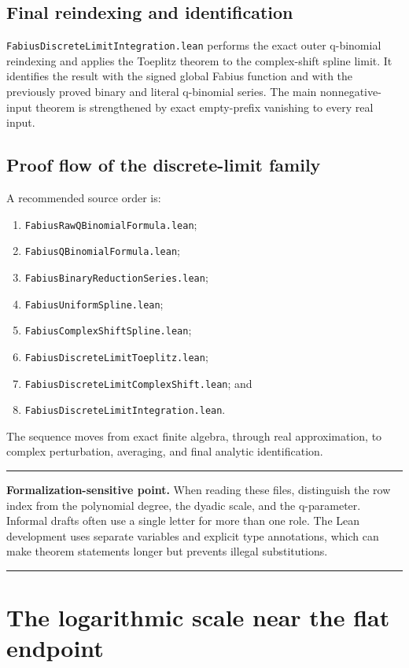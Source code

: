 \documentclass[11pt,oneside]{article}
\theoremstyle{definition}
\theoremstyle{remark}
\newenvironment{boxedremark}{%
  \par\smallskip\noindent\begin{center}\begin{minipage}{0.94\textwidth}%
  \color{black}\hrule\vspace{0.6em}\small
}{%
  \vspace{0.6em}\hrule\end{minipage}\end{center}\smallskip
}
\begin{document}
\subsection{Final reindexing and identification}
\nolinkurl{FabiusDiscreteLimitIntegration.lean} performs the exact outer
q-binomial reindexing and applies the Toeplitz theorem to the complex-shift
spline limit.  It identifies the result with the signed global Fabius function
and with the previously proved binary and literal q-binomial series.  The main
nonnegative-input theorem is strengthened by exact empty-prefix vanishing to
every real input.

\subsection{Proof flow of the discrete-limit family}
A recommended source order is:
\begin{enumerate}
  \item \nolinkurl{FabiusRawQBinomialFormula.lean};
  \item \nolinkurl{FabiusQBinomialFormula.lean};
  \item \nolinkurl{FabiusBinaryReductionSeries.lean};
  \item \nolinkurl{FabiusUniformSpline.lean};
  \item \nolinkurl{FabiusComplexShiftSpline.lean};
  \item \nolinkurl{FabiusDiscreteLimitToeplitz.lean};
  \item \nolinkurl{FabiusDiscreteLimitComplexShift.lean}; and
  \item \nolinkurl{FabiusDiscreteLimitIntegration.lean}.
\end{enumerate}
The sequence moves from exact finite algebra, through real approximation, to complex perturbation, averaging, and final analytic identification.

\begin{boxedremark}\textbf{Formalization-sensitive point.}\space
When reading these files, distinguish the row index from the polynomial degree, the dyadic scale, and the q-parameter.  Informal drafts often use a single letter for more than one role.  The Lean development uses separate variables and explicit type annotations, which can make theorem statements longer but prevents illegal substitutions.
\end{boxedremark}

\section{The logarithmic scale near the flat endpoint}\label{ch:logscale}\label{ch:asymptotics}
\end{document}
